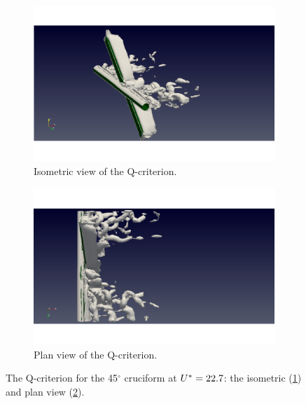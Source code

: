 \documentclass[oneside]{utmthesis}
\begin{document}
\begin{figure}[H]
  \centering
  \begin{subfigure}[h]{0.48\textwidth}
    \includegraphics[width=\textwidth,trim={1.5cm 0 3cm 0},clip]{figs/qIso045U10}
    \caption{Isometric view of the Q-criterion.}
    \label{fig:qIso045U10}
  \end{subfigure}
  \hfill
  \begin{subfigure}[h]{0.48\textwidth}
    \includegraphics[width=\textwidth,trim={1.5cm 0 3cm 0},clip]{figs/qTop045U10}
    \caption{Plan view of the Q-criterion.}
    \label{fig:qTop045U10}
  \end{subfigure}

  \caption{The Q-criterion for the 45$^{\circ}$ cruciform at $U^{*} = 22.7$: the isometric (\ref{fig:qIso045U10}) and plan view (\ref{fig:qTop045U10}).} \label{fig:qCrit045U10}
\end{figure}
\end{document}
